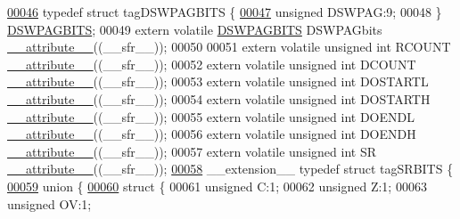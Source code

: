 \begin{DoxyCode}
\hypertarget{a00009_source_l00046}{}\hyperlink{a00008}{00046} \textcolor{keyword}{typedef} \textcolor{keyword}{struct }tagDSWPAGBITS \{
\hypertarget{a00009_source_l00047}{}\hyperlink{a00008_a3bb92d39084a37fd7cf7c826c349989d}{00047}   \textcolor{keywordtype}{unsigned} DSWPAG:9;
00048 \} \hyperlink{a00008_d1/d7e/a00434}{DSWPAGBITS};
00049 \textcolor{keyword}{extern} \textcolor{keyword}{volatile} \hyperlink{a00008_d1/d7e/a00434}{DSWPAGBITS} DSWPAGbits \hyperlink{a00009_a493c46f03454991ccc5aa7a6e1dfb2a7}{\_\_attribute\_\_}((\_\_sfr\_\_));
00050 
00051 \textcolor{keyword}{extern} \textcolor{keyword}{volatile} \textcolor{keywordtype}{unsigned} \textcolor{keywordtype}{int}  RCOUNT \hyperlink{a00009_a493c46f03454991ccc5aa7a6e1dfb2a7}{\_\_attribute\_\_}((\_\_sfr\_\_));
00052 \textcolor{keyword}{extern} \textcolor{keyword}{volatile} \textcolor{keywordtype}{unsigned} \textcolor{keywordtype}{int}  DCOUNT \hyperlink{a00009_a493c46f03454991ccc5aa7a6e1dfb2a7}{\_\_attribute\_\_}((\_\_sfr\_\_));
00053 \textcolor{keyword}{extern} \textcolor{keyword}{volatile} \textcolor{keywordtype}{unsigned} \textcolor{keywordtype}{int}  DOSTARTL \hyperlink{a00009_a493c46f03454991ccc5aa7a6e1dfb2a7}{\_\_attribute\_\_}((\_\_sfr\_\_));
00054 \textcolor{keyword}{extern} \textcolor{keyword}{volatile} \textcolor{keywordtype}{unsigned} \textcolor{keywordtype}{int}  DOSTARTH \hyperlink{a00009_a493c46f03454991ccc5aa7a6e1dfb2a7}{\_\_attribute\_\_}((\_\_sfr\_\_));
00055 \textcolor{keyword}{extern} \textcolor{keyword}{volatile} \textcolor{keywordtype}{unsigned} \textcolor{keywordtype}{int}  DOENDL \hyperlink{a00009_a493c46f03454991ccc5aa7a6e1dfb2a7}{\_\_attribute\_\_}((\_\_sfr\_\_));
00056 \textcolor{keyword}{extern} \textcolor{keyword}{volatile} \textcolor{keywordtype}{unsigned} \textcolor{keywordtype}{int}  DOENDH \hyperlink{a00009_a493c46f03454991ccc5aa7a6e1dfb2a7}{\_\_attribute\_\_}((\_\_sfr\_\_));
00057 \textcolor{keyword}{extern} \textcolor{keyword}{volatile} \textcolor{keywordtype}{unsigned} \textcolor{keywordtype}{int}  SR \hyperlink{a00009_a493c46f03454991ccc5aa7a6e1dfb2a7}{\_\_attribute\_\_}((\_\_sfr\_\_));
\hypertarget{a00009_source_l00058}{}\hyperlink{a00008}{00058} \_\_extension\_\_ \textcolor{keyword}{typedef} \textcolor{keyword}{struct }tagSRBITS \{
\hypertarget{a00009_source_l00059}{}\hyperlink{a00009}{00059}   \textcolor{keyword}{union }\{
\hypertarget{a00009_source_l00060}{}\hyperlink{a00009}{00060}     \textcolor{keyword}{struct }\{
00061       \textcolor{keywordtype}{unsigned} C:1;
00062       \textcolor{keywordtype}{unsigned} Z:1;
00063       \textcolor{keywordtype}{unsigned} OV:1;

\end{DoxyCode}
